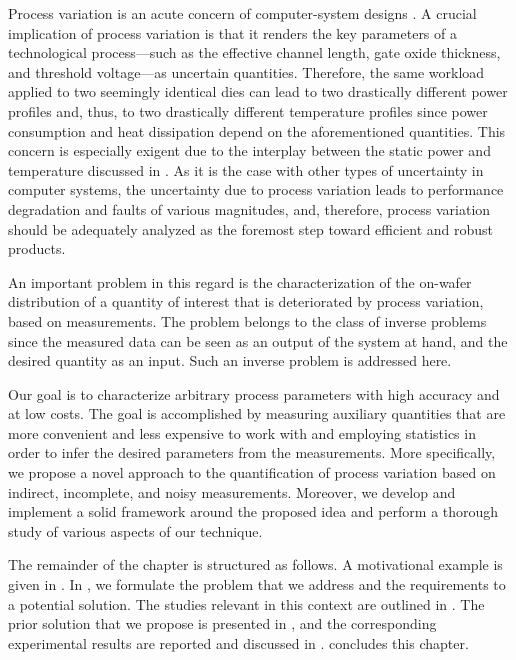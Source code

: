 Process variation is an acute concern of computer-system designs
\cite{chandrakasan2000, srivastava2010}. A crucial implication of process
variation is that it renders the key parameters of a technological
process---such as the effective channel length, gate oxide thickness, and
threshold voltage---as uncertain quantities. Therefore, the same workload
applied to two seemingly identical dies can lead to two drastically different
power profiles and, thus, to two drastically different temperature profiles
since power consumption and heat dissipation depend on the aforementioned
quantities. This concern is especially exigent due to the interplay between the
static power and temperature \cite{liu2007, srivastava2010} discussed in
. As it is the case with other types of uncertainty in
computer systems, the uncertainty due to process variation leads to performance
degradation and faults of various magnitudes, and, therefore, process variation
should be adequately analyzed as the foremost step toward efficient and robust
products.

An important problem in this regard is the characterization of the on-wafer
distribution of a quantity of interest that is deteriorated by process
variation, based on measurements. The problem belongs to the class of inverse
problems since the measured data can be seen as an output of the system at hand,
and the desired quantity as an input. Such an inverse problem is addressed here.

Our goal is to characterize arbitrary process parameters with high accuracy and
at low costs. The goal is accomplished by measuring auxiliary quantities that
are more convenient and less expensive to work with and employing statistics in
order to infer the desired parameters from the measurements. More specifically,
we propose a novel approach to the quantification of process variation based on
indirect, incomplete, and noisy measurements. Moreover, we develop and implement
a solid framework around the proposed idea and perform a thorough study of
various aspects of our technique.

The remainder of the chapter is structured as follows. A motivational example is
given in . In , we formulate
the problem that we address and the requirements to a potential solution. The
studies relevant in this context are outlined in . The
prior solution that we propose is presented in , and
the corresponding experimental results are reported and discussed in
.  concludes this chapter.


